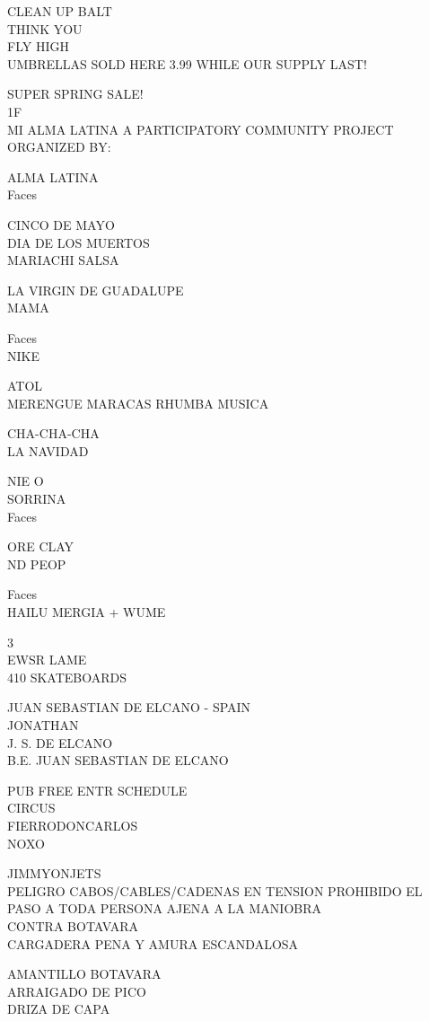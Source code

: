 \documentclass[10pt,letterpaper]{article}
\begin{document}
CLEAN UP BALT\\
THINK YOU\\
FLY HIGH\\
UMBRELLAS SOLD HERE 3.99 WHILE OUR SUPPLY LAST!

SUPER SPRING SALE!\\
1F\\
MI ALMA LATINA A PARTICIPATORY COMMUNITY PROJECT ORGANIZED BY:

ALMA LATINA\\
Faces

CINCO DE MAYO\\
DIA DE LOS MUERTOS\\
MARIACHI SALSA

LA VIRGIN DE GUADALUPE\\
MAMA

Faces\\
NIKE

ATOL\\
MERENGUE MARACAS RHUMBA MUSICA

CHA{-}CHA{-}CHA\\
LA NAVIDAD

NIE O\\
SORRINA\\
Faces

ORE CLAY\\
ND PEOP

Faces\\
HAILU MERGIA + WUME

3\\
EWSR LAME\\
410 SKATEBOARDS

JUAN SEBASTIAN DE ELCANO {-} SPAIN\\
JONATHAN\\
J. S. DE ELCANO\\
B.E. JUAN SEBASTIAN DE ELCANO

PUB FREE ENTR SCHEDULE\\
CIRCUS\\
FIERRODONCARLOS\\
NOXO

JIMMYONJETS\\
PELIGRO CABOS/CABLES/CADENAS EN TENSION PROHIBIDO EL PASO A TODA PERSONA AJENA A LA MANIOBRA\\
CONTRA BOTAVARA\\
CARGADERA PENA Y AMURA ESCANDALOSA

AMANTILLO BOTAVARA\\
ARRAIGADO DE PICO\\
DRIZA DE CAPA
\end{document}
